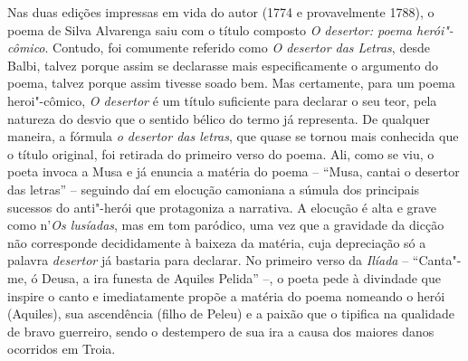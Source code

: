 Nas duas edições impressas em vida do autor (1774 e provavelmente 1788), o poema
de Silva Alvarenga saiu com o título composto \textit{O desertor: poema
herói"-cômico}. Contudo, foi comumente referido como \textit{O desertor das
Letras}, desde Balbi, talvez porque assim se declarasse mais especificamente o
argumento do poema, talvez porque assim tivesse soado bem. Mas certamente, para
um poema heroi"-cômico, \textit{O desertor} é um título suficiente para declarar o
seu teor, pela natureza do desvio que o sentido bélico do termo já representa.
De qualquer maneira, a fórmula \textit{o desertor das letras}, que quase se
tornou mais conhecida que o título original, foi retirada do primeiro verso do
poema. Ali, como se viu, o poeta invoca a Musa e já enuncia a matéria do poema
-- ``Musa, cantai o desertor das letras'' -- seguindo daí em elocução camoniana
a súmula dos principais sucessos do anti"-herói que protagoniza a narrativa.  A
elocução é alta e grave como n'\textit{Os lusíadas}, mas em tom paródico, uma
vez que a gravidade da dicção não corresponde decididamente à baixeza da
matéria, cuja depreciação só a palavra \textit{desertor} já bastaria para
declarar. No primeiro verso da \textit{Ilíada} -- ``Canta"-me, ó Deusa, a ira
funesta de Aquiles Pelida'' --, o poeta pede à divindade que inspire o canto e
imediatamente propõe a matéria do poema nomeando o herói (Aquiles), sua
ascendência (filho de Peleu) e a paixão que o tipifica na qualidade de bravo
guerreiro, sendo o destempero de sua ira a causa dos maiores danos ocorridos em
Troia.

